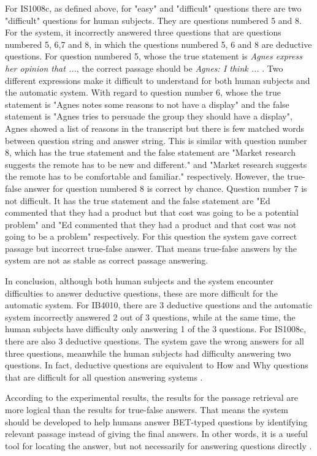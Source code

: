 For IS1008c, as defined above, for "easy" and "difficult" questions there are two "difficult" questions for human subjects. They are questions numbered 5 and 8. For the system, it incorrectly answered three questions that are questions numbered 5, 6,7 and 8, in which the questions numbered 5, 6 and 8 are deductive questions. For question numbered 5, whose the true statement is \textit{Agnes express her opinion that ...}, the correct passage should be \textit{Agnes: I think ... }. Two different expressions make it difficult to understand for both human subjects and the automatic system. With regard to question number 6, whose the true statement is "Agnes notes some reasons to not have a display" and the false statement is "Agnes tries to persuade the group they should have a display", Agnes showed a list of reasons in the transcript but there is few matched words between question string and answer string. This is similar with question number 8, which has the true statement and the false statement are "Market research suggests the remote has to be new and different." and "Market research suggests the remote has to be comfortable and familiar." respectively. However, the true-false answer for question numbered 8 is correct by chance. Question number 7 is not difficult. It has the true statement and the false statement are "Ed commented that they had a product but that cost was going to be a potential problem" and "Ed commented that they had a product and that cost was not going to be a problem" respectively. For this question the system gave correct passage but incorrect true-false answer. That means true-false answers by the system are not as stable as correct passage answering.

In conclusion, although both human subjects and the system encounter difficulties to answer deductive questions, these are more difficult for the automatic system. For IB4010, there are 3 deductive questions and the automatic system incorrectly answered 2 out of 3 questions, while at the same time, the human subjects have difficulty only answering 1 of the 3 questions. For IS1008c, there are also 3 deductive questions. The system gave the wrong answers for all three questions, meanwhile the human subjects had difficulty answering two questions. In fact, deductive questions are equivalent to How and Why questions that are difficult for all question answering systems \cite{prager2000qap, brill2002diq}.

According to the experimental results, the results for the passage retrieval are more logical than the results for true-false answers. That means the system should be developed to help humans answer BET-typed questions by identifying relevant passage instead of giving the final answers. In other words, it is a useful tool for locating the answer, but not necessarily for answering questions directly \cite{lequocanh1}.
 

\newpage




